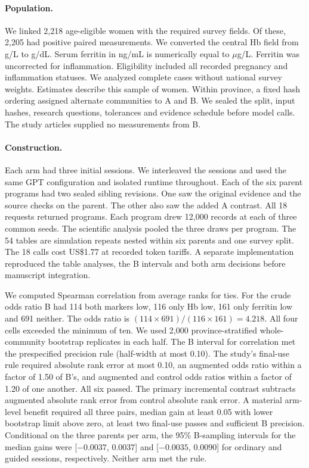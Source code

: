 \paragraph{Population.}
We linked 2,218 age-eligible women with the required survey fields. Of these, 2,205 had positive paired measurements. We converted the central Hb field from g/L to g/dL. Serum ferritin in ng/mL is numerically equal to $\mu$g/L. Ferritin was uncorrected for inflammation. Eligibility included all recorded pregnancy and inflammation statuses. We analyzed complete cases without national survey weights. Estimates describe this sample of women. Within province, a fixed hash ordering assigned alternate communities to A and B. We sealed the split, input hashes, research questions, tolerances and evidence schedule before model calls. The study articles supplied no measurements from B.

\paragraph{Construction.}
Each arm had three initial sessions. We interleaved the sessions and used the same GPT configuration and isolated runtime throughout. Each of the six parent programs had two sealed sibling revisions. One saw the original evidence and the source checks on the parent. The other also saw the added A contrast. All 18 requests returned programs. Each program drew 12,000 records at each of three common seeds. The scientific analysis pooled the three draws per program. The 54 tables are simulation repeats nested within six parents and one survey split. The 18 calls cost US\$1.77 at recorded token tariffs. A separate implementation reproduced the table analyses, the B intervals and both arm decisions before manuscript integration.

We computed Spearman correlation from average ranks for ties. For the crude odds ratio B had 114 both markers low, 116 only Hb low, 161 only ferritin low and 691 neither. The odds ratio is $(114\times691)/(116\times161)=4.218$. All four cells exceeded the minimum of ten. We used 2,000 province-stratified whole-community bootstrap replicates in each half. The B interval for correlation met the prespecified precision rule (half-width at most 0.10). The study's final-use rule required absolute rank error at most 0.10, an augmented odds ratio within a factor of 1.50 of B's, and augmented and control odds ratios within a factor of 1.20 of one another. All six passed. The primary incremental contrast subtracts augmented absolute rank error from control absolute rank error. A material arm-level benefit required all three pairs, median gain at least 0.05 with lower bootstrap limit above zero, at least two final-use passes and sufficient B precision. Conditional on the three parents per arm, the 95\% B-sampling intervals for the median gains were [$-0.0037$, $0.0037$] and [$-0.0035$, $0.0090$] for ordinary and guided sessions, respectively. Neither arm met the rule.

